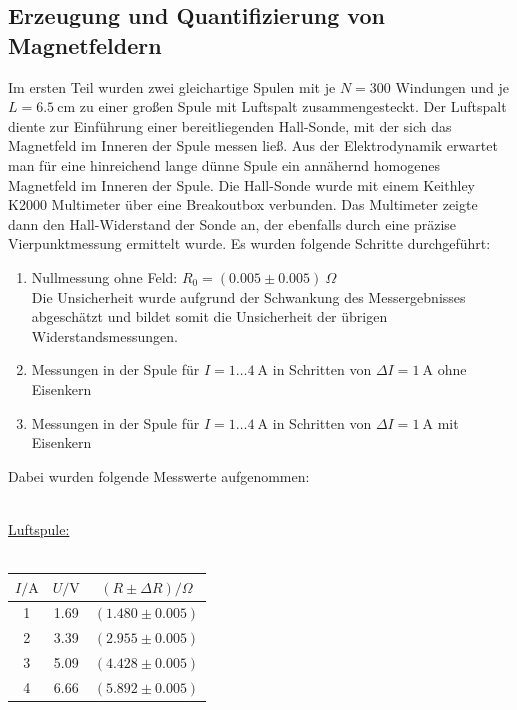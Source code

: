 \documentclass[german,  %
parskip=full,  %
]{scrartcl}
\begin{document}
\subsection{Erzeugung und Quantifizierung von Magnetfeldern}
Im ersten Teil wurden zwei gleichartige Spulen mit je \(N=300\) Windungen und je \(L=6.5 \ \mathrm{cm}\) zu einer großen Spule mit Luftspalt zusammengesteckt. Der Luftspalt diente zur Einführung einer bereitliegenden Hall-Sonde, mit der sich das Magnetfeld im Inneren der Spule messen ließ. Aus der Elektrodynamik erwartet man für eine hinreichend lange dünne Spule ein annähernd homogenes Magnetfeld im Inneren der Spule. Die Hall-Sonde wurde mit einem Keithley K2000 Multimeter über eine Breakoutbox verbunden. Das Multimeter zeigte dann den Hall-Widerstand der Sonde an, der ebenfalls durch eine präzise Vierpunktmessung ermittelt wurde. Es wurden folgende Schritte durchgeführt:
\begin{enumerate}
\item Nullmessung ohne Feld: \(R_0 = (0.005 \pm 0.005) \ \Omega\) \\
Die Unsicherheit wurde aufgrund der Schwankung des Messergebnisses abgeschätzt und bildet somit die Unsicherheit der übrigen Widerstandsmessungen.
\item Messungen in der Spule für \(I = 1\hdots 4 \ \mathrm{A}\) in Schritten von \(\Delta I = 1 \  \mathrm{A}\) ohne Eisenkern
\item Messungen in der Spule für \(I = 1\hdots 4 \ \mathrm{A}\) in Schritten von \(\Delta I = 1 \  \mathrm{A}\) mit Eisenkern
\end{enumerate}
Dabei wurden folgende Messwerte aufgenommen: \\\\
\begin{minipage}{0.45\textwidth}
\underline{Luftspule:} \\\\
\begin{tabular}{|c|c|c|}
\hline
\(I/ \mathrm{A}\) & \(U / \mathrm{V}\) & \((R \pm \Delta R )/ \Omega\) \\\hline
1 & 1.69 & \((1.480 \pm 0.005)\) \\\hline
2 & 3.39 & \((2.955 \pm 0.005)\) \\\hline
3 & 5.09 & \((4.428 \pm 0.005)\) \\\hline
4 & 6.66 & \((5.892 \pm 0.005)\) \\\hline
\end{tabular}
\end{minipage}
\end{document}
